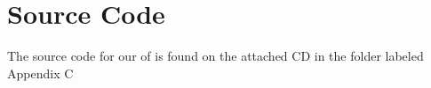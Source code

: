
\chapter{Source Code}
The source code for our \subsystem{} of \system{} is found on the attached CD in the folder labeled Appendix C